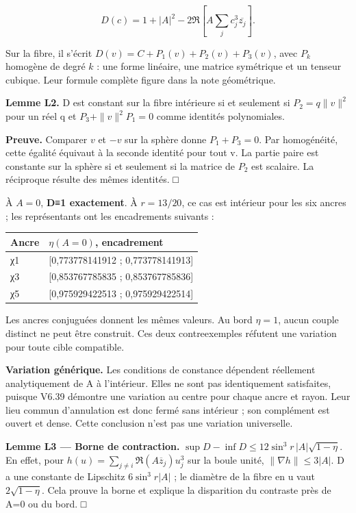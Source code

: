 \documentclass[
  10pt,
  a4paper,
]{article}
\begin{document}
\[
D(c)=1+|A|^2-2\Re\left[A\sum_jc_j^3\overline{z_j}\right].
\]

Sur la fibre, il s'écrit \(D(v)=C+P_1(v)+P_2(v)+P_3(v)\), avec \(P_k\)
homogène de degré \(k\) : une forme linéaire, une matrice symétrique et
un tenseur cubique. Leur formule complète figure dans la note
géométrique.

\textbf{Lemme L2.} D est constant sur la fibre intérieure si et
seulement si \(P_2=q\|v\|^2\) pour un réel q et \(P_3+\|v\|^2P_1=0\)
comme identités polynomiales.

\textbf{Preuve.} Comparer \(v\) et \(-v\) sur la sphère donne
\(P_1+P_3=0\). Par homogénéité, cette égalité équivaut à la seconde
identité pour tout v. La partie paire est constante sur la sphère si et
seulement si la matrice de \(P_2\) est scalaire. La réciproque résulte
des mêmes identités. □

À \(A=0\), \textbf{D≡1 exactement}. À \(r=13/20\), ce cas est intérieur
pour les six ancres ; les représentants ont les encadrements suivants :

\begin{longtable}[]{@{}ll@{}}
\toprule\noalign{}
Ancre & \(\eta(A=0)\), encadrement \\
\midrule\noalign{}
\endhead
\bottomrule\noalign{}
\endlastfoot
χ1 & {[}0,773778141912 ; 0,773778141913{]} \\
χ3 & {[}0,853767785835 ; 0,853767785836{]} \\
χ5 & {[}0,975929422513 ; 0,975929422514{]} \\
\end{longtable}

Les ancres conjuguées donnent les mêmes valeurs. Au bord \(\eta=1\),
aucun couple distinct ne peut être construit. Ces deux contreexemples
réfutent une variation pour toute cible compatible.

\textbf{Variation générique.} Les conditions de constance dépendent
réellement analytiquement de A à l'intérieur. Elles ne sont pas
identiquement satisfaites, puisque V6.39 démontre une variation au
centre pour chaque ancre et rayon. Leur lieu commun d'annulation est
donc fermé sans intérieur ; son complément est ouvert et dense. Cette
conclusion n'est pas une variation universelle.

\textbf{Lemme L3 --- Borne de contraction.}
\(\sup D-\inf D\le12\sin^3 r\,|A|\sqrt{1-\eta}\). En effet, pour
\(h(u)=\sum_{j\ne i}\Re(A\overline z_j)u_j^3\) sur la boule unité,
\(\|\nabla h\|\le3|A|\). D a une constante de Lipschitz \(6\sin^3r|A|\)
; le diamètre de la fibre en u vaut \(2\sqrt{1-\eta}\). Cela prouve la
borne et explique la disparition du contraste près de A=0 ou du bord. □
\end{document}
